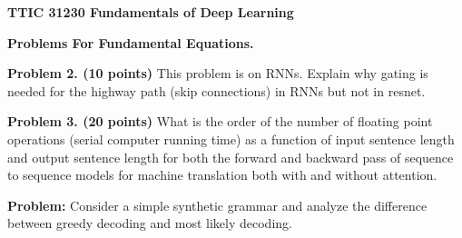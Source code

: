 \documentclass{article}
\begin{document}
\centerline{\bf TTIC 31230 Fundamentals of Deep Learning}
\centerline{\bf Problems For Fundamental Equations.}

\bigskip
\bigskip
    {\bf Problem 2. (10 points)} This problem is on RNNs.  Explain why gating is needed for the highway path (skip connections) in RNNs but not in resnet.

    
{\bf Problem 3. (20 points)} What is the order of the number of floating point operations (serial computer running time)
as a function of input sentence length and output sentence length
for both the forward and backward pass of sequence to sequence models for machine translation both with and without attention.

\bigskip
{\bf Problem:} Consider a simple synthetic grammar and analyze the difference between greedy decoding and most likely decoding.
\end{document}

